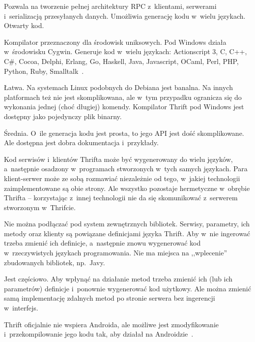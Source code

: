 \begin{description}
Pozwala na tworzenie pełnej architektury RPC z~klientami, serwerami i~serializacją przesyłanych danych. Umożliwia generację kodu w~wielu językach. Otwarty kod. 

Kompilator przeznaczony dla środowisk uniksowych. Pod Windows działa w~środowisku Cygwin.
Generuje kod w~wielu językach: Actionscript 3, C, C++, C\#, Cocoa, Delphi, Erlang, Go, Haskell, Java, Javascript, OCaml, Perl, PHP, Python, Ruby, Smalltalk~\cite{thrift-features}.

Łatwa.
Na systemach Linux podobnych do Debiana jest banalna. Na innych platformach też nie jest skomplikowana, ale w~tym przypadku ogranicza się do wykonania jednej (choć długiej) komendy.
Kompilator Thrift pod Windows jest dostępny jako pojedynczy plik binarny.

Średnia. O~ile generacja kodu jest prosta, to jego API jest dość skomplikowane. Ale dostępna jest dobra dokumentacja i~przykłady.

Kod serwisów i~klientów Thrifta może być wygenerowany do wielu języków, a~następnie osadzony w~programach stworzonych w~tych samych językach.
Para klient-serwer może ze sobą rozmawiać niezależnie od tego, w~jakiej technologii zaimplementowane są obie strony.
Ale wszystko pozostaje hermetyczne w~obrębie Thrifta -- korzystając z~innej technologii nie da się skomunikować z~serwerem stworzonym w~Thrifcie.

Nie można podłączać pod system zewnętrznych bibliotek. Serwisy, parametry, ich metody oraz klienty są powiązane definicjami języka Thrift.
Aby w~nie ingerować trzeba zmienić ich definicje, a~następnie znowu wygenerować kod w~rzeczywistych językach programowania. Nie ma miejsca na ,,wplecenie'' zbudowanych bibliotek, np.\ Javy.


Jest częściowo. Aby wpłynąć na działanie metod trzeba zmienić ich (lub ich parametrów) definicje i~ponownie wygenerować kod użytkowy.
Ale można zmienić samą implementację zdalnych metod po stronie serwera bez ingerencji w~interfejs. 

Thrift oficjalnie nie wspiera Androida, ale możliwe jest zmodyfikowanie i~przekompilowanie jego kodu tak, aby działał na Androidzie~\cite{thrift-android}.


\end{description}
